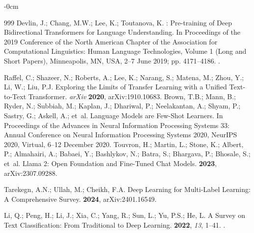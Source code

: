 \documentclass[make,article,accept,pdftex,moreauthors]{Definitions/mdpi}
\begin{document}
\begin{adjustwidth}{-\extralength}{0cm}
\begin{thebibliography}{999}
Devlin, J.; Chang, M.W.; Lee, K.; Toutanova, K.
: Pre-training of Deep Bidirectional Transformers for Language
  Understanding.
\newblock In Proceedings of the 2019 Conference of the North
  {A}merican Chapter of the Association for Computational Linguistics: Human
  Language Technologies, Volume 1 (Long and Short Papers), Minneapolis, 
  MN, USA, 2--7 June 2019; pp. 4171--4186.
.

Raffel, C.; Shazeer, N.; Roberts, A.; Lee, K.; Narang, S.; Matena, M.; Zhou,
  Y.; Li, W.; Liu, P.J.
\newblock Exploring the Limits of Transfer Learning with a Unified Text-to-Text
  Transformer. \emph{arXiv}  \textbf{2020}, arXiv:1910.10683.
Brown, T.B.; Mann, B.; Ryder, N.; Subbiah, M.; Kaplan, J.; Dhariwal, P.;
  Neelakantan, A.; Shyam, P.; Sastry, G.; Askell, A.;  et~al.
\newblock Language Models are Few-Shot Learners.
\newblock In Proceedings of the Advances in Neural Information Processing
  Systems 33: Annual Conference on Neural Information Processing Systems 2020,
  NeurIPS 2020, Virtual, 6--12 December 2020.
Touvron, H.; Martin, L.; Stone, K.; Albert, P.; Almahairi, A.; Babaei, Y.;
  Bashlykov, N.; Batra, S.; Bhargava, P.; Bhosale, S.;  et~al.
\newblock Llama 2: Open Foundation and Fine-Tuned Chat Models.
 {\bf 2023}, arXiv:2307.09288.

Tarekegn, A.N.; Ullah, M.; Cheikh, F.A.
\newblock Deep Learning for Multi-Label Learning: A Comprehensive Survey.
 {\bf 2024}, arXiv:2401.16549.

Li, Q.; Peng, H.; Li, J.; Xia, C.; Yang, R.; Sun, L.; Yu, P.S.; He, L.
\newblock A Survey on Text Classification: From Traditional to Deep Learning.
 {\bf 2022}, {\em 13}, 1--41.
.


\end{thebibliography}
\end{adjustwidth}
\end{document}
